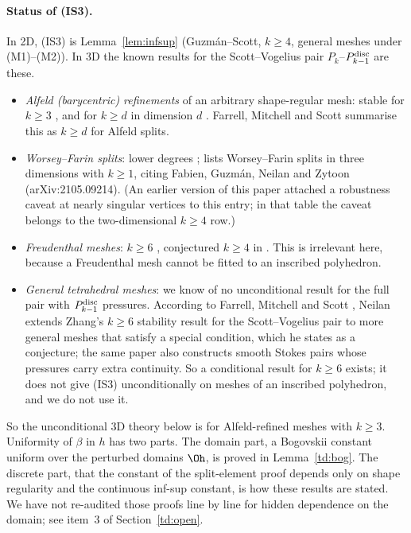 \paragraph{Status of (IS3).} In 2D, (IS3) is Lemma~\ref{lem:infsup} (Guzm\'an--Scott, $k\ge4$, general meshes under (M1)--(M2)). In 3D the known results for the Scott--Vogelius pair $P_k$--$P_{k-1}^{\rm disc}$ are these.
\begin{itemize}
\item \emph{Alfeld (barycentric) refinements} of an arbitrary shape-regular mesh: stable for $k\ge3$ \cite{Zhang2005}, and for $k\ge d$ in dimension $d$ \cite{GuzmanNeilan2018}. Farrell, Mitchell and Scott \cite{FarrellMitchellScott2024} summarise this as $k\ge d$ for Alfeld splits.
\item \emph{Worsey--Farin splits}: lower degrees \cite{GuzmanLischkeNeilan2022}; \cite[Table~2.1]{FarrellMitchellScott2024} lists Worsey--Farin splits in three dimensions with $k\ge1$, citing Fabien, Guzm\'an, Neilan and Zytoon (arXiv:2105.09214). (An earlier version of this paper attached a robustness caveat at nearly singular vertices to this entry; in that table the caveat belongs to the two-dimensional $k\ge4$ row.)
\item \emph{Freudenthal meshes}: $k\ge6$ \cite{Zhang2011}, conjectured $k\ge4$ in \cite{FarrellMitchellScott2024}. This is irrelevant here, because a Freudenthal mesh cannot be fitted to an inscribed polyhedron.
\item \emph{General tetrahedral meshes}: we know of no unconditional result for the full pair with $P_{k-1}^{\rm disc}$ pressures. According to Farrell, Mitchell and Scott \cite{FarrellMitchellScott2024}, Neilan \cite[Proposition~6.5]{Neilan2015} extends Zhang's $k\ge6$ stability result for the Scott--Vogelius pair to more general meshes that satisfy a special condition, which he states as a conjecture; the same paper also constructs smooth Stokes pairs whose pressures carry extra continuity. So a conditional result for $k\ge6$ exists; it does not give (IS3) unconditionally on meshes of an inscribed polyhedron, and we do not use it.
\end{itemize}
So the unconditional 3D theory below is for Alfeld-refined meshes with $k\ge3$. Uniformity of $\beta$ in $h$ has two parts. The domain part, a Bogovskii constant uniform over the perturbed domains $\Oh$, is proved in Lemma~\ref{td:bog}. The discrete part, that the constant of the split-element proof depends only on shape regularity and the continuous inf-sup constant, is how these results are stated. We have not re-audited those proofs line by line for hidden dependence on the domain; see item~3 of Section~\ref{td:open}.

